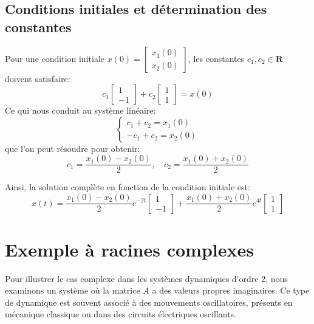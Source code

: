         \subsection{Conditions initiales et détermination des constantes}
            Pour une condition initiale $x(0)=\begin{bmatrix} x_1(0) \\ x_2(0) \end{bmatrix}$, les constantes $c_1, c_2 \in \mathbf{R}$ doivent satisfaire:
            \begin{equation}
                c_1 \begin{bmatrix} 1 \\ -1 \end{bmatrix} + c_2 \begin{bmatrix} 1 \\ 1 \end{bmatrix}=x(0)
            \end{equation}
            Ce qui nous conduit au système linéaire:
            \begin{equation}
                \begin{cases}
                    c_1 + c_2=x_1(0) \\
                    -c_1 + c_2=x_2(0)
                \end{cases}
            \end{equation}
            que l’on peut résoudre pour obtenir:
            \begin{equation}
                c_1=\frac{x_1(0) - x_2(0)}{2}, \quad c_2=\frac{x_1(0) + x_2(0)}{2}
            \end{equation}
            
            Ainsi, la solution complète en fonction de la condition initiale est:
            \begin{equation}
                x(t)=\frac{x_1(0) - x_2(0)}{2} e^{-2t} \begin{bmatrix} 1 \\ -1 \end{bmatrix} + \frac{x_1(0) + x_2(0)}{2} e^{4t} \begin{bmatrix} 1 \\ 1 \end{bmatrix}
            \end{equation}

    \section{Exemple à racines complexes}
        Pour illustrer le cas complexe dans les systèmes dynamiques d'ordre 2, nous examinons un système où la matrice $A$ a des valeurs propres imaginaires. Ce type de dynamique est souvent associé à des mouvements oscillatoires, présents en mécanique classique ou dans des circuits électriques oscillants.
        
